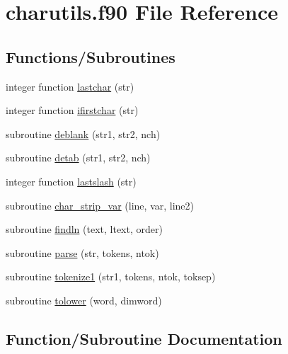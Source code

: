 \hypertarget{charutils_8f90}{}\section{charutils.\+f90 File Reference}
\label{charutils_8f90}
\subsection*{Functions/\+Subroutines}
\begin{DoxyCompactItemize}
\item 
integer function \hyperlink{charutils_8f90_a87970b69be4fb4bc3a18d6494928ffd7}{lastchar} (str)
\item 
integer function \hyperlink{charutils_8f90_a77d86dbb6e1b84eb3d65ca2810dc4c83}{ifirstchar} (str)
\item 
subroutine \hyperlink{charutils_8f90_ae6acc7e2374eb737e74a4edf85c3f1c2}{deblank} (str1, str2, nch)
\item 
subroutine \hyperlink{charutils_8f90_a3bed35f0ef06f900852da004a901ceaa}{detab} (str1, str2, nch)
\item 
integer function \hyperlink{charutils_8f90_a5e6b358f2c83a143003b006a530e8f3b}{lastslash} (str)
\item 
subroutine \hyperlink{charutils_8f90_aafbf897239b3e7ece2b4b8c7f050546a}{char\+\_\+strip\+\_\+var} (line, var, line2)
\item 
subroutine \hyperlink{charutils_8f90_a8157b2c97c7e594d512866e2e9f6e947}{findln} (text, ltext, order)
\item 
subroutine \hyperlink{charutils_8f90_a386868af54eb7d95d214363b9132230f}{parse} (str, tokens, ntok)
\item 
subroutine \hyperlink{charutils_8f90_a4e0b5a3a2a3a429434a954e8af39d758}{tokenize1} (str1, tokens, ntok, toksep)
\item 
subroutine \hyperlink{charutils_8f90_a2bd99695e205166c38b103139c05d3cf}{tolower} (word, dimword)
\end{DoxyCompactItemize}


\subsection{Function/\+Subroutine Documentation}
\hypertarget{charutils_8f90_aafbf897239b3e7ece2b4b8c7f050546a}{}
